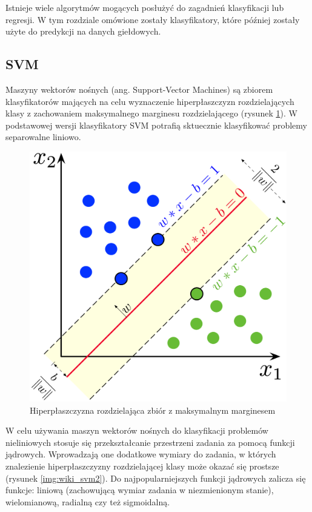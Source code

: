 \documentclass[a4paper, twoside, 11pt, openright]{article}
\begin{document}
Istnieje wiele algorytmów mogących posłużyć do zagadnień klasyfikacji lub regresji. W tym rozdziale omówione zostały klasyfikatory, które później zostały użyte do predykcji na danych giełdowych.

\subsection{SVM}

Maszyny wektorów nośnych (ang. Support-Vector Machines)\cite{svm} są zbiorem klasyfikatorów mających na celu wyznaczenie hiperpłaszczyzn rozdzielających klasy z zachowaniem maksymalnego marginesu rozdzielającego (rysunek \ref{img:wiki_svm}). W podstawowej wersji klasyfikatory SVM potrafią sktuecznie klasyfikować problemy separowalne liniowo.


\begin{figure}[H]
\centering \includegraphics[scale=0.9]{img/svm.png}
\caption{Hiperpłaszczyzna rozdzielająca zbiór z maksymalnym marginesem \cite{wikisvm}}
\label{img:wiki_svm}
\end{figure}

W celu używania maszyn wektorów nośnych do klasyfikacji problemów nieliniowych stosuje się przekształcanie przestrzeni zadania za pomocą funkcji jądrowych. Wprowadzają one dodatkowe wymiary do zadania, w których znalezienie hiperpłaszczyzny rozdzielającej klasy może okazać się prostsze (rysunek \ref{img:wiki_svm2}). Do najpopularniejszych funkcji jądrowych zalicza się funkcje: liniową (zachowującą wymiar zadania w niezmienionym stanie), wielomianową, radialną czy też sigmoidalną.
\end{document}
